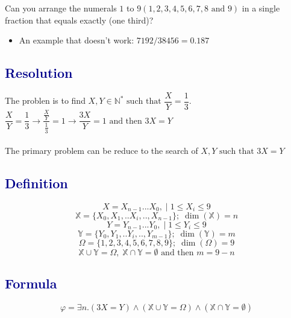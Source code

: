 \documentclass[12pt]{article}
\theoremstyle{definition}
\theoremstyle{plain}
\begin{document}
\vspace{0.5cm}
\begin{tcolorbox}[colback=lightgray, colframe=darkblue, boxrule=1pt]
Can you arrange the numerals $1$ to $9 (1,2,3,4,5,6,7,8 \text{ and }9)$ in a single fraction that equals exactly (one third)?
\begin{itemize}
  \item An example that doesn't work: $7192/38456 = 0.187$
\end{itemize}
\end{tcolorbox}
\subsection*{\textcolor{darkblue}{Resolution}}
The problen is to find $X, Y \in \mathbb{N^*} \text{ such that } \dfrac{X}{Y} = \dfrac{1}{3}$.\\ $\dfrac{X}{Y} = \dfrac{1}{3} \rightarrow \dfrac{\frac{X}{Y}}{\frac{1}{3}} = 1 \rightarrow \dfrac{3X}{Y} = 1 \text{ and then } 3X = Y$\\\\
The primary problem can be reduce to the search of $X, Y \text{ such that } 3X = Y$

\subsection*{\textcolor{darkblue}{Definition}}
\begin{equation}
  X = X_{n-1}...X_0,\;|\; 1 \leq X_i \leq 9
\end{equation}
\begin{equation}
  \mathbb{X} = \{X_0, X_1, .. X_i, .., X_{n-1}\} ;\; \dim(\mathbb{X}) = n
\end{equation}
\begin{equation}
  Y = Y_{n-1}...Y_0,\;|\; 1 \leq Y_i \leq 9
\end{equation}
\begin{equation}
  \mathbb{Y} = \{Y_0, Y_1, .. Y_i, .., Y_{m-1}\};\; \dim(\mathbb{Y}) = m
\end{equation}
\begin{equation}
  \Omega = \{ 1, 2,3,4,5,6,7,8,9\};\; \dim(\Omega) = 9
\end{equation}
\begin{equation}
  \mathbb{X} \cup \mathbb{Y} = \Omega,\; \mathbb{X} \cap \mathbb{Y} = \emptyset \text{ and then } m = 9 - n
\end{equation}
\subsection*{\textcolor{darkblue}{Formula}}
\begin{equation}
  \varphi = \exists n. \left(3X = Y\right)
         \wedge \left(\mathbb{X} \cup \mathbb{Y} = \Omega\right)
         \wedge \left(\mathbb{X} \cap \mathbb{Y} = \emptyset\right)
\end{equation}
\end{document}
